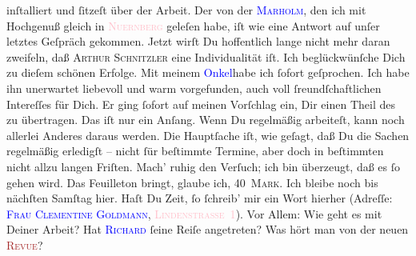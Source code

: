                inſtalliert und ſitzeſt über der Arbeit. Der \label{K_mets_Goldmann_94-partII-999v}\label{K_mets_Goldmann_94-partII-999h}{ }{\pb}von der \textsc{\textcolor{blue}{Marholm}{}\ledrightnote{\textcolor{blue}{Laura Marholm}}}, den ich mit
               Hochgenuß gleich in \textsc{\textcolor{pink}{Nuernberg}{}\ledrightnote{\textcolor{pink}{Nürnberg}}} geleſen habe, iſt  wie eine
               Antwort auf unſer letztes Geſpräch gekommen. Jetzt wirſt Du hoffentlich lange nicht
               mehr daran zweifeln, daß \textsc{Arthur Schnitzler} eine
               Individualität iſt. Ich beglückwünſche Dich zu dieſem schönen Erfolge.\pend
           \pstart
           Mit  meinem \textcolor{blue}{Onkel}{}habe ich ſofort geſprochen. Ich habe ihn unerwartet
               liebevoll und warm vorgefunden, auch voll ſreundſchaftlichen Intereſſes für Dich. Er
               ging ſofort auf meinen Vorſchlag ein, Dir einen Theil des \label{K_L02612-2v}\label{K_L02612-2h} zu übertragen. Das iſt nur ein Anſang. Wenn Du regelmäßig arbeiteſt,
               kann noch {\pb}allerlei Anderes daraus werden. Die
               Hauptſache iſt, wie geſagt, daß Du die Sachen regelmäßig erledigſt – nicht ſür
               beſtimmte Termine, aber doch in beſtimmten nicht allzu langen Friſten. Mach’ ruhig
               den Verſuch; ich bin überzeugt, daß es ſo gehen wird. Das Feuilleton bringt, {\pb}glaube ich, \textsc{40 Mark}.\pend
           \pstart
           Ich bleibe noch bis nächſten Samſtag hier. Haſt Du
               Zeit, ſo ſchreib’ mir ein Wort hierher (Adreſſe: \textsc{\textcolor{blue}{Frau Clementine Goldmann}{}\ledrightnote{\textcolor{blue}{Clementine Goldmann}}}, \textsc{\textcolor{pink}{Lindenstraße 1}{}\ledrightnote{\textcolor{pink}{Lindenstraße}}}). Vor
               Allem: Wie geht es mit Deiner Arbeit? Hat \textsc{\textcolor{blue}{Richard}{}\ledrightnote{\textcolor{blue}{Richard Beer-Hofmann}}}{ }{\pb} ſeine Reiſe angetreten? Was hört man von der neuen
                  \textsc{\textcolor{brown}{Revue}{}}?\pend
